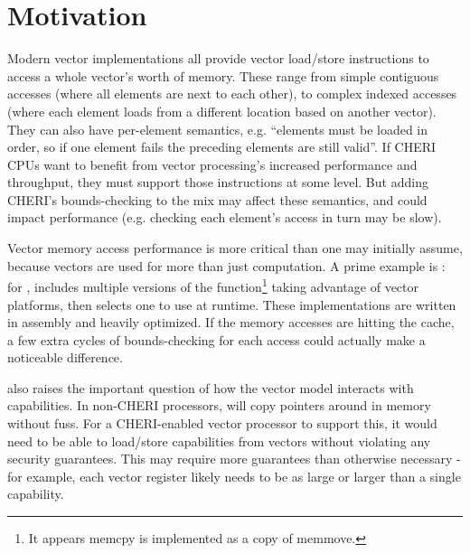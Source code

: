 

\section{Motivation}
Modern vector implementations all provide vector load/store instructions to access a whole vector's worth of memory.
These range from simple contiguous accesses (where all elements are next to each other), to complex indexed accesses (where each element loads from a different location based on another vector).
They can also have per-element semantics, e.g. ``elements must be loaded in order, so if one element fails the preceding elements are still valid''.
If CHERI CPUs want to benefit from vector processing's increased performance and throughput, they must support those instructions at some level.
But adding CHERI's bounds-checking to the mix may affect these semantics, and could impact performance (e.g. checking each element's access in turn may be slow).

Vector memory access performance is more critical than one may initially assume, because vectors are used for more than just computation.
A prime example is : for ,  includes multiple versions of the function\footnote{It appears memcpy is implemented as a copy of memmove.} taking advantage of vector platforms, then selects one to use at runtime.
These implementations are written in assembly and heavily optimized.
If the memory accesses are hitting the cache, a few extra cycles of bounds-checking for each access could actually make a noticeable difference.

 also raises the important question of how the vector model interacts with capabilities.
In non-CHERI processors,  will copy pointers around in memory without fuss.
For a CHERI-enabled vector processor to support this, it would need to be able to load/store capabilities from vectors without violating any security guarantees.
This may require more guarantees than otherwise necessary - for example, each vector register likely needs to be as large or larger than a single capability.

